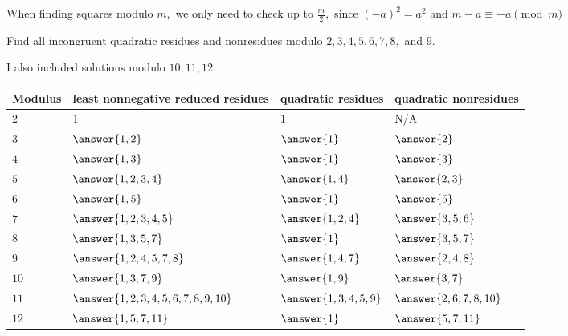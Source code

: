 \documentclass{ximera}
\begin{document}
\begin{remark}
    When finding squares modulo $m,$ we only need to check up to $\frac{m}{2},$ since $(-a)^2=a^2$ and $m-a\equiv -a\pmod{m}$
\end{remark}

\begin{br}
    Find all incongruent quadratic residues and nonresidues modulo $2,3,4,5,6,7,8,$ and $9$.


    \begin{solution}
        I also included solutions modulo $10,11,12$

        \begin{tabular}{p{1.5cm}|p{4cm}p{3cm}p{3cm}}
            Modulus & least nonnegative reduced residues & quadratic residues & quadratic nonresidues \\\hline
            $2$ & $1$   
                & $1$ 
                & N/A \\
            $3$ & $\answer{1,2}$ 
                & $\answer{1}$
                & $\answer{2}$\\
            $4$ & $\answer{1,3}$ 
                & $\answer{1}$
                & $\answer{3}$\\
            $5$ & $\answer{1,2,3,4}$
                & $\answer{1,4}$
                & $\answer{2,3}$\\
            $6$ & $\answer{1,5}$
                & $\answer{1}$
                & $\answer{5}$\\
            $7$ & $\answer{1,2,3,4,5}$
                & $\answer{1,2,4}$
                & $\answer{3,5,6}$\\
            $8$ & $\answer{1,3,5,7}$
                & $\answer{1}$
                & $\answer{3,5,7}$\\
            $9$ & $\answer{1,2,4,5,7,8}$
                & $\answer{1,4,7}$
                & $\answer{2,4,8}$\\
            $10$ & $\answer{1,3,7,9}$
                & $\answer{1,9}$
                & $\answer{3,7}$\\
            $11$ & $\answer{1,2,3,4,5,6,7,8,9,10}$
                & $\answer{1,3,4,5,9}$
                & $\answer{2,6,7,8,10}$\\
            $12$ & $\answer{1,5,7,11}$
                & $\answer{1}$
                & $\answer{5,7,11}$\\
        \end{tabular}
    \end{solution}
\end{br}
\end{document}
